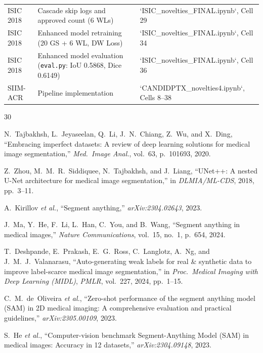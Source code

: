 \documentclass[journal,11pt,onecolumn,draftclsnofoot]{IEEEtran}
\begin{document}
\begin{table}[h]
\begin{tabular}{@{}llp{6.8cm}@{}}
ISIC 2018 & Cascade skip logs and approved count (6 WLs) & `ISIC_novelties_FINAL.ipynb`, Cell 29 \\
ISIC 2018 & Enhanced model retraining (20 GS + 6 WL, DW Loss) & `ISIC_novelties_FINAL.ipynb`, Cell 34 \\
ISIC 2018 & Enhanced model evaluation (\texttt{eval.py}: IoU 0.5868, Dice 0.6149) & `ISIC_novelties_FINAL.ipynb`, Cell 36 \\
\midrule
SIIM-ACR & Pipeline implementation & `CANDIDPTX_novelties4.ipynb`, Cells 8--38 \\
\bottomrule
\end{tabular}
\end{table}

\begin{thebibliography}{30}

N.~Tajbakhsh, L.~Jeyaseelan, Q.~Li, J.~N.~Chiang, Z.~Wu, and X.~Ding, ``Embracing imperfect datasets: A review of deep learning solutions for medical image segmentation,'' \emph{Med.\ Image Anal.}, vol.~63, p.~101693, 2020.

Z.~Zhou, M.~M.~R.~Siddiquee, N.~Tajbakhsh, and J.~Liang, ``UNet++: A nested U-Net architecture for medical image segmentation,'' in \emph{DLMIA/ML-CDS}, 2018, pp.~3--11.

A.~Kirillov \emph{et al.}, ``Segment anything,'' \emph{arXiv:2304.02643}, 2023.

J.~Ma, Y.~He, F.~Li, L.~Han, C.~You, and B.~Wang, ``Segment anything in medical images,'' \emph{Nature Communications}, vol.~15, no.~1, p.~654, 2024.

T.~Deshpande, E.~Prakash, E.~G.~Ross, C.~Langlotz, A.~Ng, and J.~M.~J.~Valanarasu, ``Auto-generating weak labels for real \& synthetic data to improve label-scarce medical image segmentation,'' in \emph{Proc.\ Medical Imaging with Deep Learning (MIDL)}, \emph{PMLR}, vol.~227, 2024, pp.~1--15.

C.~M.~de~Oliveira \emph{et al.}, ``Zero-shot performance of the segment anything model (SAM) in 2D medical imaging: A comprehensive evaluation and practical guidelines,'' \emph{arXiv:2305.00109}, 2023.

S.~He \emph{et al.}, ``Computer-vision benchmark Segment-Anything Model (SAM) in medical images: Accuracy in 12 datasets,'' \emph{arXiv:2304.09148}, 2023.


\end{thebibliography}
\end{document}
